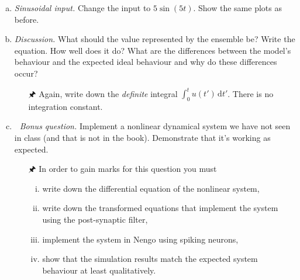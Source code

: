 \begin{enumerate}[a)]
		\item {} \emph{Sinusoidal input.} Change the input to $5\sin(5t)$. Show the same plots as before.
		\item {} \emph{Discussion.} What should the value represented by the ensemble be? Write the equation. How well does it do? What are the differences between the model's behaviour and the expected ideal behaviour and why do these differences occur?
		\begin{itemize}
			\item[{\symbolfont 🖈}] Again, write down the \emph{definite} integral $\int_0^t u(t') \,\mathrm{d}t'$. There is no integration constant.
\end{itemize}
		\item {} \textit{{\symbolfont 🌟} Bonus question.} Implement a nonlinear dynamical system we have not seen in class (and that is not in the book). Demonstrate that it's working as expected.
		\begin{itemize}
			\item[{\symbolfont 🖈}] In order to gain marks for this question you must
			\begin{enumerate}[(i)]
				\item write down the differential equation of the nonlinear system,
				\item write down the transformed equations that implement the system using the post-synaptic filter,
				\item implement the system in Nengo using spiking neurons,
				\item show that the simulation results match the expected system behaviour at least qualitatively.
			\end{enumerate}
		\end{itemize}
	\end{enumerate}


